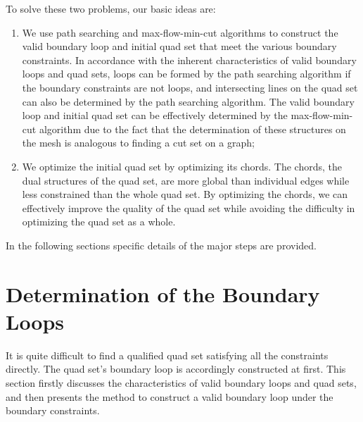 \documentclass[final,5p,times,twocolumn]{elsarticle}
\begin{document}
To solve these two problems, our basic ideas are:
\begin{enumerate}
  \item We use path searching and max-flow-min-cut algorithms to construct the valid boundary loop and initial quad set that meet the various boundary constraints. In accordance with the inherent characteristics of valid boundary loops and quad sets, loops can be formed by the path searching algorithm if the boundary constraints are not loops, and intersecting lines on the quad set can also be determined by the path searching algorithm. The valid boundary loop and initial quad set can be effectively determined by the max-flow-min-cut algorithm due to the fact that the determination of these structures on the mesh is analogous to finding a cut set on a graph;
  \item We optimize the initial quad set by optimizing its chords. The chords, the dual structures of the quad set, are more global than individual edges while less constrained than the whole quad set. By optimizing the chords, we can effectively improve the quality of the quad set while avoiding the difficulty in optimizing the quad set as a whole.
\end{enumerate}

In the following sections specific details of the major steps are provided.

\section{Determination of the Boundary Loops}
\label{sec:det_bound_loops}
It is quite difficult to find a qualified quad set satisfying all the constraints directly. The quad set's boundary loop is accordingly constructed at first. This section firstly discusses the characteristics of valid boundary loops and quad sets, and then presents the method to construct a valid boundary loop under the boundary constraints.
\end{document}
